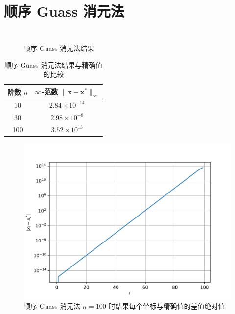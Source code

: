 \documentclass{sjtuarticle}
\begin{document}
\clearpage

\section{顺序 Guass 消元法}
\vspace*{-0.5cm}
\inputminted[firstline=23,lastline=47]{python3}{main.py}
\vspace*{-0.5cm}
\begin{minipage}{0.5\textwidth}
    \begin{figure}[H]
        \centering
        \inputminted[firstline=1,lastline=34,fontsize=\tiny]{text}{stdout.txt}
        \caption{顺序 Guass 消元法结果}
    \end{figure}
\end{minipage}
\begin{minipage}{0.45\textwidth}
    \begin{table}[H]
        \centering
        \caption{顺序 Guass 消元法结果与精确值的比较}
        \begin{tabular}{cc}
            \toprule
            阶数 $n$ & $\infty$-范数 $\lVert \bm{x}-\bm{x}^* \rVert_\infty$ \\
            \midrule
            10  & $2.84\times 10^{-14}$ \\
            30  & $2.98\times 10^{-8}$  \\
            100 & $3.52\times 10^{13}$  \\
            \bottomrule
        \end{tabular}
    \end{table}
    \vspace*{-0.75cm}
    \begin{figure}[H]
        \centering
        \includegraphics[width=\textwidth]{pic/SeqGuassSolver.pdf}
        \caption{顺序 Guass 消元法 $n=100$ 时结果每个坐标与精确值的差值绝对值}
    \end{figure}
\end{minipage}
\end{document}
